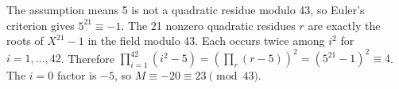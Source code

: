 The assumption means 5 is not a quadratic residue modulo 43, so Euler's criterion gives $ 5^{21}\equiv-1 $. The 21 nonzero quadratic residues $ r $ are exactly the roots of $ X^{21}-1 $ in the field modulo 43. Each occurs twice among $ i^2 $ for $ i=1,\ldots,42 $. Therefore $\prod_{i=1}^{42}(i^2-5)=\left(\prod_r(r-5)\right)^2=(5^{21}-1)^2\equiv4 $. The $ i=0 $ factor is $-5 $, so $ M\equiv-20\equiv\boxed{23}\pmod{43}$.
